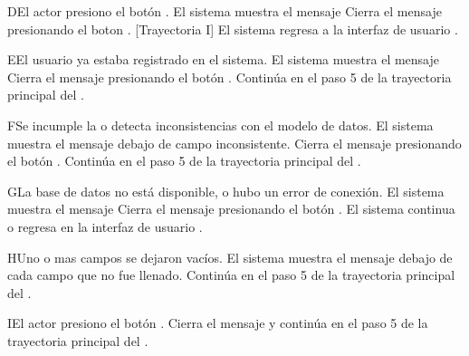 \begin{UCtrayectoriaA}{D}{El actor presiono el botón .}
	\UCpaso El sistema muestra el mensaje 
	\UCpaso[\UCactor] Cierra el mensaje presionando el boton . [Trayectoria I]
	\UCpaso El sistema regresa a la interfaz de usuario .
\end{UCtrayectoriaA}

\begin{UCtrayectoriaA}{E}{El usuario ya estaba registrado en el sistema.}
	\UCpaso El sistema muestra el mensaje  
	\UCpaso[\UCactor] Cierra el mensaje presionando el botón .
	\UCpaso Continúa en el paso 5 de la trayectoria principal del .
\end{UCtrayectoriaA}

\begin{UCtrayectoriaA}{F}{Se incumple la  o detecta inconsistencias con el modelo de datos.}
		\UCpaso El sistema muestra el mensaje  debajo de campo inconsistente.
		\UCpaso[\UCactor] Cierra el mensaje presionando el botón .
		\UCpaso Continúa en el paso 5 de la trayectoria principal del .
	\end{UCtrayectoriaA}
	
	
	
	\begin{UCtrayectoriaA}{G}{La base de datos no está disponible, o hubo un error de conexión.}
		\UCpaso El sistema muestra el mensaje 
		\UCpaso[\UCactor] Cierra el mensaje presionando el botón .
		\UCpaso El sistema continua o regresa en la interfaz de usuario .
	\end{UCtrayectoriaA}
	
	
	\begin{UCtrayectoriaA}{H}{Uno o mas campos se dejaron vacíos.}
		\UCpaso El sistema muestra el mensaje  debajo de cada campo que no fue llenado. 
		\UCpaso	Continúa en el paso 5 de la trayectoria principal del .
	\end{UCtrayectoriaA}

	\begin{UCtrayectoriaA}{I}{El actor presiono el botón .}
		\UCpaso Cierra el mensaje y continúa en el paso 5 de la trayectoria principal del .	
	\end{UCtrayectoriaA}